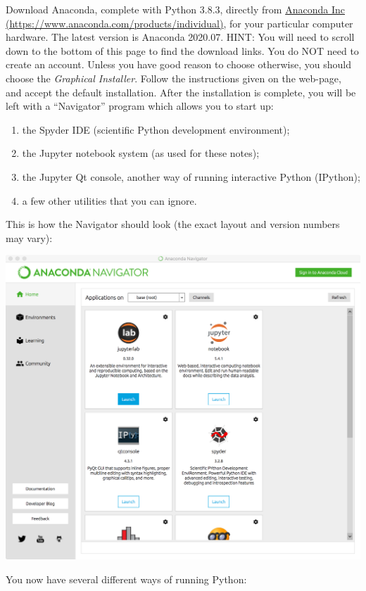 \documentclass[10pt]{article}
\providecommand{\tightlist}{%
      \setlength{\itemsep}{0pt}\setlength{\parskip}{0pt}}
\begin{document}
Download Anaconda, complete with Python 3.8.3, directly from
\href{https://www.anaconda.com/downloads}{Anaconda Inc
(https://www.anaconda.com/products/individual)}, for your particular
computer hardware. The latest version is Anaconda 2020.07. HINT: You
will need to scroll down to the bottom of this page to find the download
links. You do NOT need to create an account. Unless you have good reason
to choose otherwise, you should choose the \emph{Graphical Installer}.
Follow the instructions given on the web-page, and accept the default
installation. After the installation is complete, you will be left with
a ``Navigator'' program which allows you to start up:

\begin{enumerate}
\def\labelenumi{\arabic{enumi}.}
\tightlist
\item
  the Spyder IDE (scientific Python development environment);
\item
  the Jupyter notebook system (as used for these notes);
\item
  the Jupyter Qt console, another way of running interactive Python
  (IPython);
\item
  a few other utilities that you can ignore.
\end{enumerate}

This is how the Navigator should look (the exact layout and version
numbers may vary):

\includegraphics[width=0.9\linewidth]{Navigator.png}

You now have several different ways of running Python:
\end{document}
